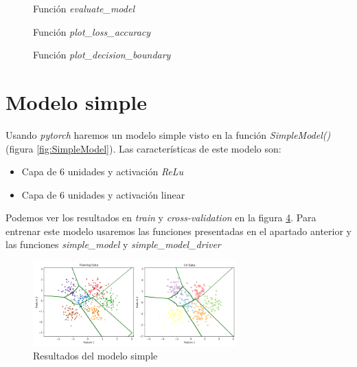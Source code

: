\documentclass[6pt]{../../shared/AiTex}
\begin{document}
\begin{figure}[H]
    \centering
    
    \caption{Función \textit{evaluate\_model}}
    \label{fig:evaluate_model}
\end{figure}

\begin{figure}[H]
    \centering
    
    \caption{Función \textit{plot\_loss\_accuracy}}
    \label{fig:plot_loss_accuracy}
\end{figure}

\begin{figure}[H]
    \centering
    
    \caption{Función \textit{plot\_decision\_boundary}}
    \label{fig:plot_decision_boundary}
\end{figure}
\section{Modelo simple}

Usando \textit{pytorch} haremos un modelo simple visto en la función \textit{SimpleModel()} (figura \ref{fig:SimpleModel}). Las características de este modelo son:
\begin{itemize}
    \item Capa de 6 unidades y activación \textit{ReLu}
    \item Capa de 6 unidades y activación linear
\end{itemize}

Podemos ver los resultados en \textit{train} y \textit{cross-validation} en la figura \ref{fig:simple_results}. Para entrenar este modelo usaremos las funciones presentadas en el apartado anterior y las funciones \textit{simple\_model} y \textit{simple\_model\_driver}

\begin{figure}[H]
    \centering
    \includegraphics[width=0.7\textwidth]{./images/decision_boundary_simple.png}
    \caption{Resultados del modelo simple}
    \label{fig:simple_results}
\end{figure}
\end{document}
